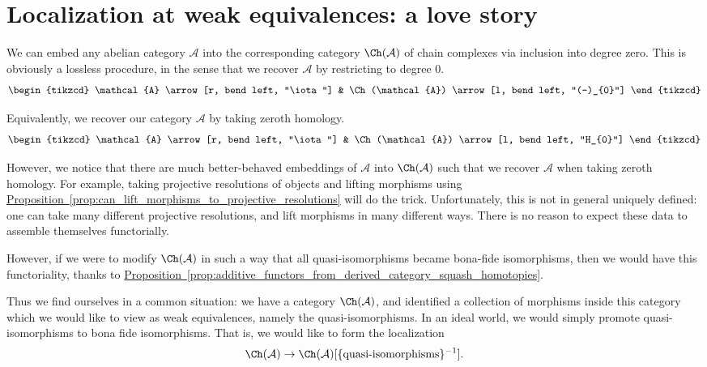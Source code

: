 \documentclass[main.tex]{subfiles}
\begin{document}
\section{Localization at weak equivalences: a love story}
\label{sec:localization_at_weak_equivalences_a_love_story}

We can embed any abelian category $\mathcal{A}$ into the corresponding category $\Ch(\mathcal{A})$ of chain complexes via inclusion into degree zero. This is obviously a lossless procedure, in the sense that we recover $\mathcal{A}$ by restricting to degree $0$.
\begin{equation*}
  \begin{tikzcd}
    \mathcal{A}
    \arrow[r, bend left, "\iota"]
    & \Ch(\mathcal{A})
    \arrow[l, bend left, "(-)_{0}"]
  \end{tikzcd}
\end{equation*}

Equivalently, we recover our category $\mathcal{A}$ by taking zeroth homology.
\begin{equation*}
  \begin{tikzcd}
    \mathcal{A}
    \arrow[r, bend left, "\iota"]
    & \Ch(\mathcal{A})
    \arrow[l, bend left, "H_{0}"]
  \end{tikzcd}
\end{equation*}

However, we notice that there are much better-behaved embeddings of $\mathcal{A}$ into $\Ch(\mathcal{A})$ such that we recover $\mathcal{A}$ when taking zeroth homology. For example, taking projective resolutions of objects and lifting morphisms using \hyperref[prop:can_lift_morphisms_to_projective_resolutions]{Proposition~\ref*{prop:can_lift_morphisms_to_projective_resolutions}} will do the trick. Unfortunately, this is not in general uniquely defined: one can take many different projective resolutions, and lift morphisms in many different ways. There is no reason to expect these data to assemble themselves functorially.

However, if we were to modify $\Ch(\mathcal{A})$ in such a way that all quasi-isomorphisms became bona-fide isomorphisms, then we would have this functoriality, thanks to \hyperref[prop:additive_functors_from_derived_category_squash_homotopies]{Proposition~\ref*{prop:additive_functors_from_derived_category_squash_homotopies}}.

Thus we find ourselves in a common situation: we have a category $\Ch(\mathcal{A})$, and identified a collection of morphisms inside this category which we would like to view as weak equivalences, namely the quasi-isomorphisms. In an ideal world, we would simply promote quasi-isomorphisms to bona fide isomorphisms. That is, we would like to form the localization
\begin{equation*}
  \Ch(\mathcal{A}) \to \Ch(\mathcal{A})[\{\text{quasi-isomorphisms}\}^{-1}].
\end{equation*}
\end{document}
